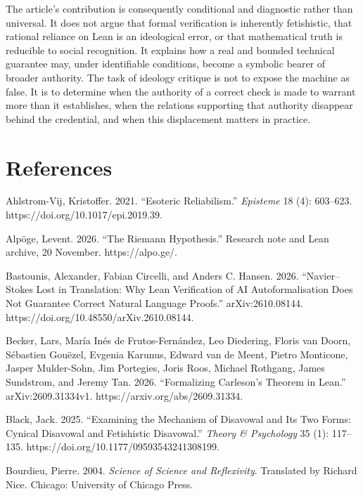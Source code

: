 \documentclass[sn-apa]{sn-jnl}
\begin{document}
The article’s contribution is consequently conditional and diagnostic rather than universal. It does not argue that formal verification is inherently fetishistic, that rational reliance on Lean is an ideological error, or that mathematical truth is reducible to social recognition. It explains how a real and bounded technical guarantee may, under identifiable conditions, become a symbolic bearer of broader authority. The task of ideology critique is not to expose the machine as false. It is to determine when the authority of a correct check is made to warrant more than it establishes, when the relations supporting that authority disappear behind the credential, and when this displacement matters in practice.

\section*{References}
\noindent\hangindent=0.5in Ahlstrom-Vij, Kristoffer. 2021. “Esoteric Reliabilism.” \emph{Episteme} 18 (4): 603–623. https://doi.org/10.1017/epi.2019.39.\par\medskip
\noindent\hangindent=0.5in Alpöge, Levent. 2026. “The Riemann Hypothesis.” Research note and Lean archive, 20 November. https://alpo.ge/.\par\medskip
\noindent\hangindent=0.5in Bastounis, Alexander, Fabian Circelli, and Anders C. Hansen. 2026. “Navier–Stokes Lost in Translation: Why Lean Verification of AI Autoformalisation Does Not Guarantee Correct Natural Language Proofs.” arXiv:2610.08144. https://doi.org/10.48550/arXiv.2610.08144.\par\medskip
\noindent\hangindent=0.5in Becker, Lars, María Inés de Frutos-Fernández, Leo Diedering, Floris van Doorn, Sébastien Gouëzel, Evgenia Karunus, Edward van de Meent, Pietro Monticone, Jasper Mulder-Sohn, Jim Portegies, Joris Roos, Michael Rothgang, James Sundstrom, and Jeremy Tan. 2026. “Formalizing Carleson’s Theorem in Lean.” arXiv:2609.31334v1. https://arxiv.org/abs/2609.31334.\par\medskip
\noindent\hangindent=0.5in Black, Jack. 2025. “Examining the Mechanism of Disavowal and Its Two Forms: Cynical Disavowal and Fetishistic Disavowal.” \emph{Theory \& Psychology} 35 (1): 117–135. https://doi.org/10.1177/09593543241308199.\par\medskip
\noindent\hangindent=0.5in Bourdieu, Pierre. 2004. \emph{Science of Science and Reflexivity}. Translated by Richard Nice. Chicago: University of Chicago Press.\par\medskip
\end{document}
